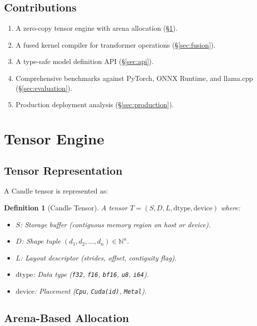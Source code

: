 \documentclass[11pt,twocolumn]{article}
\newtheorem{definition}{Definition}
\begin{document}
\subsection{Contributions}

\begin{enumerate}[leftmargin=1.4em]
    \item A zero-copy tensor engine with arena allocation (\S\ref{sec:tensor}).
    \item A fused kernel compiler for transformer operations (\S\ref{sec:fusion}).
    \item A type-safe model definition API (\S\ref{sec:api}).
    \item Comprehensive benchmarks against PyTorch, ONNX Runtime, and llama.cpp (\S\ref{sec:evaluation}).
    \item Production deployment analysis (\S\ref{sec:production}).
\end{enumerate}

\section{Tensor Engine}
\label{sec:tensor}

\subsection{Tensor Representation}

A Candle tensor is represented as:

\begin{definition}[Candle Tensor]
A tensor $T = (S, D, L, \text{dtype}, \text{device})$ where:
\begin{itemize}[leftmargin=1.1em]
    \item $S$: Storage buffer (contiguous memory region on host or device).
    \item $D$: Shape tuple $(d_1, d_2, \ldots, d_n) \in \mathbb{N}^n$.
    \item $L$: Layout descriptor (strides, offset, contiguity flag).
    \item $\text{dtype}$: Data type (\texttt{f32}, \texttt{f16}, \texttt{bf16}, \texttt{u8}, \texttt{i64}).
    \item $\text{device}$: Placement (\texttt{Cpu}, \texttt{Cuda(id)}, \texttt{Metal}).
\end{itemize}
\end{definition}

\subsection{Arena-Based Allocation}
\end{document}
